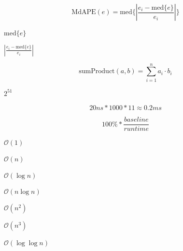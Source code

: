 \documentclass{article}
\begin{document}
\[         \mathrm{MdAPE}(e) = \mathrm{med}\{| \frac{e_i - \mathrm{med}\{e\}}{e_i}| \}
\]
\pagebreak

$ \mathrm{med}\{e\} $
\pagebreak

$ | \frac{e_i - \mathrm{med}\{e\}}{e_i}| $
\pagebreak

\[            \mathrm{sumProduct}(a,b) = \sum_{i=1}^{n}a_i\cdot b_i
\]
\pagebreak

$ 2^{51} $
\pagebreak

\[20ns * 1000 * 11 \approx 0.2ms
\]
\pagebreak

\[100\% * \frac{baseline}{runtime}
\]
\pagebreak

$ \mathcal{O}(1) $
\pagebreak

$ \mathcal{O}(n) $
\pagebreak

$ \mathcal{O}(\log{}n) $
\pagebreak

$ \mathcal{O}(n\log{}n) $
\pagebreak

$ \mathcal{O}(n^2) $
\pagebreak

$ \mathcal{O}(n^3) $
\pagebreak

$ \mathcal{O}(\log{}\log{}n) $
\pagebreak
\end{document}
